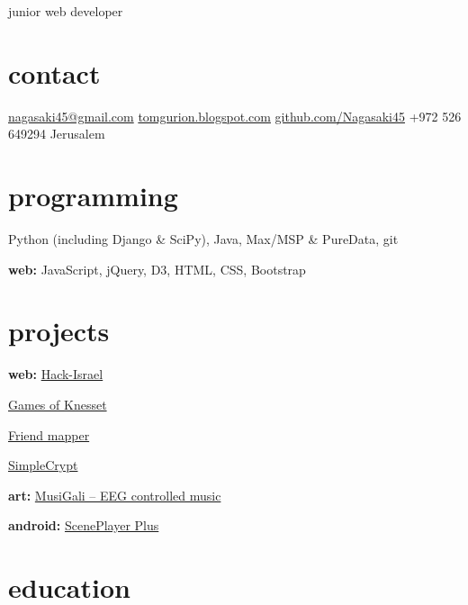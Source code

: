 \documentclass[]{friggeri-cv}  %
\begin{document}
       {junior web developer}


\begin{aside}
\section{contact}
\href{mailto:nagasaki45@gmail.com}{nagasaki45@gmail.com}
\href{http://tomgurion.blogspot.com}{tomgurion.blogspot.com}
\href{https://github.com/Nagasaki45}{github.com/Nagasaki45}
+972 526 649294
Jerusalem

\section{programming}
Python (including Django \& SciPy), Java, Max/MSP \& PureData, git

\textbf{web:}
JavaScript, jQuery, D3, HTML, CSS, Bootstrap

\section{projects}
\textbf{web:}
\href{http://hack-israel.herokuapp.com/}{Hack-Israel}

\href{http://fantasy-knesset.herokuapp.com/}{Games of Knesset}

\href{http://friends-mapper.herokuapp.com/}{Friend mapper}

\href{http://simplecrypt.appspot.com/}{SimpleCrypt}

\textbf{art:}
\href{http://tomgurion.blogspot.co.il/2013/10/musigali-eeg-controlled-music-for-brain.html}{MusiGali -- EEG controlled music}

\textbf{android:}
\href{https://play.google.com/store/apps/details?id=com.nagasaki45.sceneplayerplus}{ScenePlayer Plus}

\end{aside}


\section{education}
\end{document}
